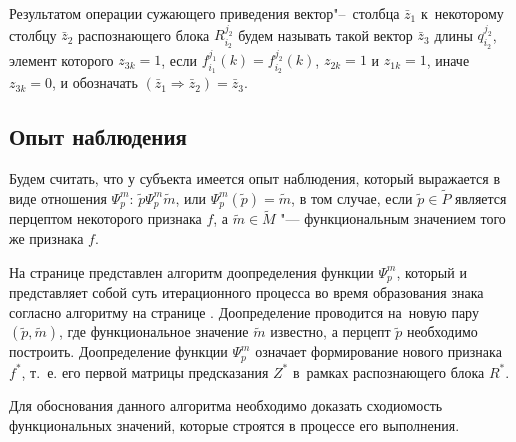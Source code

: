 \begin{Def}
	Результатом операции сужающего приведения вектор"--~столбца $\bar z_1$ к~некоторому столбцу $\bar z_2$ распознающего блока $R_{i_2}^{j_2}$ будем называть такой вектор $\bar z_3$ длины $q_{i_2}^{j_2}$, элемент которого $z_{3k}=1$, если $f_{i_1}^{j_1}(k)=f_{i_2}^{j_2}(k)$, $z_{2k}=1$ и $z_{1k}=1$, иначе $z_{3k}=0$, и обозначать $(\bar z_1\Rightarrow \bar z_2)=\bar z_3$.
\end{Def}

\subsection{Опыт наблюдения}

Будем считать, что у субъекта имеется опыт наблюдения, который выражается в виде отношения $\Psi_p^m$: $\tilde p\Psi_p^m \tilde m$, или $\Psi_p^m(\tilde p)=\tilde m$, в том случае, если $\tilde p\in\tilde P$ является перцептом некоторого признака $f$, а $\tilde m\in\tilde M$ "--- функциональным значением того же признака $f$.

На странице \pageref{alg:cycle_pm} представлен алгоритм доопределения функции $\Psi_p^m$, который и представляет собой суть итерационного процесса во время образования знака согласно алгоритму на странице \pageref{new_sign_alg}. Доопределение проводится на~новую пару $(\tilde p,\tilde m)$, где функциональное значение $\tilde m$ известно, а перцепт $\tilde p$ необходимо построить. Доопределение функции $\Psi_p^m$ означает формирование нового признака $f^*$, т.~е. его первой матрицы предсказания $Z^*$ в~рамках распознающего блока $R^*$.

Для обоснования данного алгоритма необходимо доказать сходиомость функциональных значений, которые строятся в процессе его выполнения.

